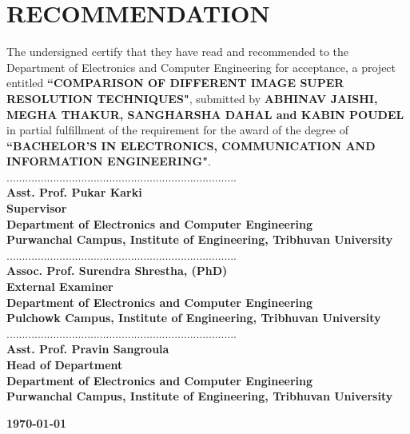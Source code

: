 \newpage
{}
\section*{RECOMMENDATION}
The undersigned certify that they have read and recommended to the Department of
Electronics and Computer Engineering for acceptance, a project entitled \textbf{``COMPARISON OF DIFFERENT IMAGE SUPER RESOLUTION TECHNIQUES"}, submitted by \textbf{ABHINAV JAISHI, MEGHA THAKUR, SANGHARSHA DAHAL and KABIN POUDEL} in partial fulfillment of the requirement for the award of the degree of \textbf{``BACHELOR'S IN ELECTRONICS, COMMUNICATION AND INFORMATION ENGINEERING"}.
        \vspace{1cm} \\
..........................................................................\\
\textbf{Asst. Prof. Pukar Karki\\
Supervisor\\
Department of Electronics and Computer Engineering\\
Purwanchal Campus, Institute of Engineering, Tribhuvan University}
        \vspace{1cm} \\
..........................................................................\\
\textbf{Assoc. Prof. Surendra Shrestha, (PhD)\\
External Examiner \\
Department of Electronics and Computer Engineering\\
Pulchowk Campus, Institute of Engineering, Tribhuvan University}
        \vspace{1cm} \\
..........................................................................\\
\textbf{
Asst. Prof. Pravin Sangroula\\ 
Head of Department \\
Department of Electronics and Computer Engineering\\Purwanchal Campus, Institute of Engineering, Tribhuvan University}\par
\vspace{2.5cm}

\begin{center}
\textbf{\today}
\end{center}